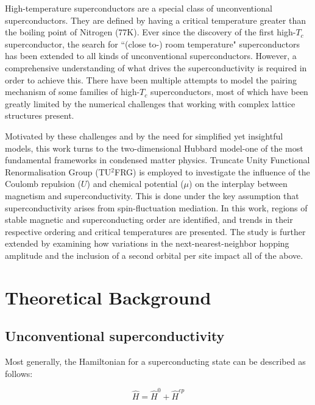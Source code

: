 \documentclass[12pt]{article}
\begin{document}
\medskip
\noindent High-temperature superconductors are a special class of unconventional superconductors. They are defined by having a critical temperature greater than the boiling point 
of Nitrogen (77K). Ever since the discovery of the first high-$T_c$ superconductor\cite{bednorz1986possible}, the search for ``(close to-) room temperature" superconductors has been extended to 
all kinds of unconventional superconductors. However, a comprehensive understanding of what drives the superconductivity is required in order 
to achieve this. There have been multiple attempts to model the pairing mechanism of some families of high-$T_c$ superconductors, most of which have
been greatly limited by the numerical challenges that working with complex lattice structures present.\par 

\medskip
\noindent Motivated by these challenges and by the need for simplified yet insightful models, this work turns to the two-dimensional Hubbard model-one of the most fundamental frameworks in condensed matter physics. Truncate Unity Functional Renormalisation Group (TU$^2$FRG)\cite{eckhardt2020truncated} is employed to 
investigate the influence of the Coulomb repulsion ($U$) and chemical potential ($\mu$) on the interplay between magnetism and superconductivity.
This is done under the key assumption that superconductivity arises from spin-fluctuation mediation.
In this work, regions of stable magnetic and superconducting order are identified, and trends in their respective ordering and critical temperatures are presented.
The study is further extended by examining how variations in the next-nearest-neighbor hopping amplitude and the inclusion of a second orbital per site impact all of the above.





\section{Theoretical Background}

\subsection{Unconventional superconductivity}

\noindent Most generally, the Hamiltonian for a superconducting state can be described as follows:

\begin{equation}\label{General Hamiltonian}
    \hat{H} = \hat{H}^0 + \hat{H}^{cp}
\end{equation}
\end{document}
